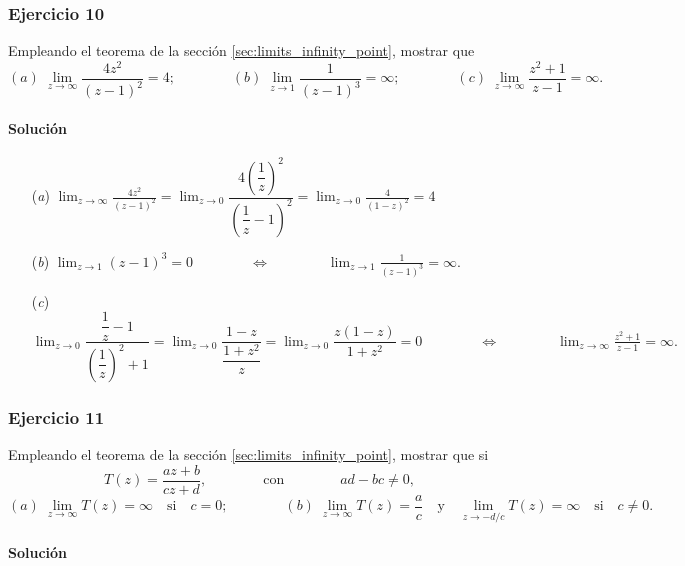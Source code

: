 \documentclass[a4paper]{report}
\begin{document}
\subsubsection{Ejercicio 10} 

Empleando el teorema de la sección \ref{sec:limits_infinity_point}, mostrar que 
\[
 (\textit{a})\;\lim_{z\to\infty}\frac{4z^2}{(z-1)^2}=4;\qquad\qquad 
 (\textit{b})\;\lim_{z\to1}\frac{1}{(z-1)^3}=\infty;\qquad\qquad
 (\textit{c})\;\lim_{z\to\infty}\frac{z^2+1}{z-1}=\infty.
\]

\paragraph{Solución} 

\begin{enumerate}
 \item[(\textit{a})]
 \(\displaystyle
 \lim_{z\to\infty}\frac{4z^2}{(z-1)^2}=\lim_{z\to0}\dfrac{4\left(\dfrac{1}{z}\right)^2}{\left(\dfrac{1}{z}-1\right)^2}=\lim_{z\to0}\frac{4}{(1-z)^2}=4
 \)
 \item[(\textit{b})]
 \(\displaystyle
  \lim_{z\to1}(z-1)^3=0
  \qquad\qquad\Leftrightarrow\qquad\qquad
  \lim_{z\to1}\frac{1}{(z-1)^3}=\infty.
 \)
 \item[(\textit{c})]
 \(\displaystyle
  \lim_{z\to0}\dfrac{\dfrac{1}{z}-1}{\left(\dfrac{1}{z}\right)^2+1}
  =\lim_{z\to0}\dfrac{1-z}{\dfrac{1+z^2}{z}}
  =\lim_{z\to0}\dfrac{z(1-z)}{1+z^2}=0
  \qquad\qquad\Leftrightarrow\qquad\qquad
  \lim_{z\to\infty}\frac{z^2+1}{z-1}=\infty.
 \)
\end{enumerate} 

\subsubsection{Ejercicio 11} 

Empleando el teorema de la sección \ref{sec:limits_infinity_point}, mostrar que si
\[
 T(z)=\frac{az+b}{cz+d},
 \qquad\qquad\textrm{con}\qquad\qquad
 ad-bc\neq0,
\]
\[
 (\textit{a})\;\lim_{z\to\infty}T(z)=\infty\quad\textrm{si}\quad c=0;\qquad\qquad
 (\textit{b})\;\lim_{z\to\infty}T(z)=\frac{a}{c}\quad\textrm{y}\quad\lim_{z\to-d/c}T(z)=\infty\quad\textrm{si}\quad c\neq0.
\]

\paragraph{Solución} 
\end{document}
